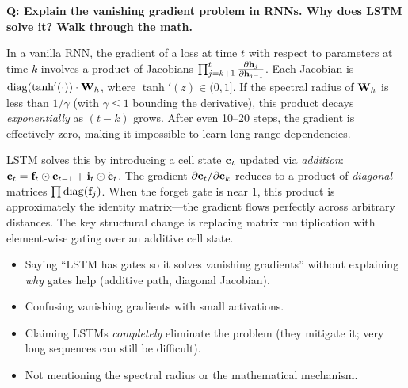 \begin{interviewq}
\textbf{Q: Explain the vanishing gradient problem in RNNs. Why does LSTM
solve it? Walk through the math.}

 \quad {} \quad
\badgefreq{\freqhigh}

\stronganswer
In a vanilla RNN, the gradient of a loss at time $t$ with respect to
parameters at time $k$ involves a product of Jacobians
$\prod_{j=k+1}^{t} \frac{\partial \mathbf{h}_j}{\partial \mathbf{h}_{j-1}}$.
Each Jacobian is
$\operatorname{diag}(\tanh'(\cdot)) \cdot \mathbf{W}_h$,
where $\tanh'(z) \in (0, 1]$.  If the spectral radius of $\mathbf{W}_h$ is less
than $1/\gamma$ (with $\gamma \leq 1$ bounding the derivative), this
product decays \emph{exponentially} as $(t - k)$ grows.  After even 10--20
steps, the gradient is effectively zero, making it impossible to learn
long-range dependencies.

LSTM solves this by introducing a cell state $\mathbf{c}_t$ updated via
\emph{addition}: $\mathbf{c}_t = \mathbf{f}_t \odot \mathbf{c}_{t-1} +
\mathbf{i}_t \odot \tilde{\mathbf{c}}_t$.  The gradient
$\partial \mathbf{c}_t / \partial \mathbf{c}_k$ reduces to a product of
\emph{diagonal} matrices $\prod \operatorname{diag}(\mathbf{f}_j)$.  When the forget
gate is near 1, this product is approximately the identity matrix---the
gradient flows perfectly across arbitrary distances.  The key structural
change is replacing matrix multiplication with element-wise gating over
an additive cell state.

\redflags
\begin{itemize}
\item Saying ``LSTM has gates so it solves vanishing gradients'' without
  explaining \emph{why} gates help (additive path, diagonal Jacobian).
\item Confusing vanishing gradients with small activations.
\item Claiming LSTMs \emph{completely} eliminate the problem (they
  mitigate it; very long sequences can still be difficult).
\item Not mentioning the spectral radius or the mathematical mechanism.
\end{itemize}



\end{interviewq}
